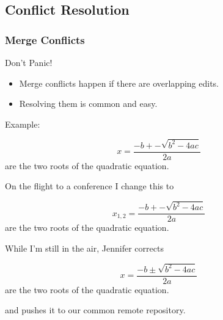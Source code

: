 \subsection{Conflict Resolution}


\begin{frame}[fragile]
  \frametitle{Merge Conflicts}
  
  \begin{center}
    \Large Don't Panic!
  \end{center}

  \begin{itemize}
  \item<2->
    Merge conflicts happen if there are overlapping edits.
  \item<3->
    Resolving them is common and easy.
  \end{itemize}
  
  \pause
  \pause
  \pause
  Example:
  \begin{latexCode}
    \begin{equation}
      \label{eq:quad}
      x = \frac{-b+-\sqrt{b^2-4ac}}{2a}
    \end{equation}
    are the two roots of the quadratic equation.
  \end{latexCode}
\end{frame}



\begin{frame}[fragile]
  
  On the flight to a conference I change this to
  \begin{latexCode}
    \begin{equation}
      \label{eq:quad}
      x_{1,2} = \frac{-b+-\sqrt{b^2-4ac}}{2a}
    \end{equation}
    are the two roots of the quadratic equation.
  \end{latexCode}
  \bigskip
  \pause
  
  While I'm still in the air, Jennifer corrects
  \begin{latexCode}
    \begin{equation}
      \label{eq:quad}
      x = \frac{-b\pm\sqrt{b^2-4ac}}{2a}
    \end{equation}
    are the two roots of the quadratic equation.
  \end{latexCode}
  and pushes it to our common remote repository.
  
\end{frame}


